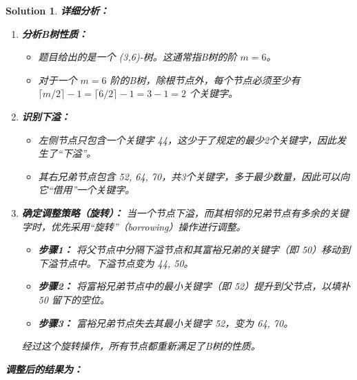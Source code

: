 \documentclass[UTF8]{report}
\newtheorem{solution}{Solution}
\theoremstyle{MyLineTheoremStyle} %
\theoremstyle{MyBlockTheoremStyle} %
\theoremstyle{MySubsubsectionStyle} %
\begin{document}
\begin{solution}
\textbf{详细分析：}

\begin{enumerate}
    \item \textbf{分析B树性质：}
    \begin{itemize}
        \item 题目给出的是一个 (3,6)-树。这通常指B树的阶 $m=6$。
        \item 对于一个 $m=6$ 阶的B树，除根节点外，每个节点必须至少有 $\lceil m/2 \rceil - 1 = \lceil 6/2 \rceil - 1 = 3 - 1 = 2$ 个关键字。
    \end{itemize}

    \item \textbf{识别下溢：}
    \begin{itemize}
        \item 左侧节点只包含一个关键字 {44}，这少于了规定的最少2个关键字，因此发生了“下溢”。
        \item 其右兄弟节点包含 {52, 64, 70}，共3个关键字，多于最少数量，因此可以向它“借用”一个关键字。
    \end{itemize}

    \item \textbf{确定调整策略（旋转）：}
    当一个节点下溢，而其相邻的兄弟节点有多余的关键字时，优先采用“旋转”（borrowing）操作进行调整。
    \begin{itemize}
        \item \textbf{步骤1：} 将父节点中分隔下溢节点和其富裕兄弟的关键字（即 {50}）移动到下溢节点中。下溢节点变为 {44, 50}。
        \item \textbf{步骤2：} 将富裕兄弟节点中的最小关键字（即 {52}）提升到父节点，以填补 {50} 留下的空位。
        \item \textbf{步骤3：} 富裕兄弟节点失去其最小关键字 {52}，变为 {64, 70}。
    \end{itemize}
    经过这个旋转操作，所有节点都重新满足了B树的性质。

\end{enumerate}

\textbf{调整后的结果为：}
\begin{center}
\end{center}
\end{solution}
\end{document}
